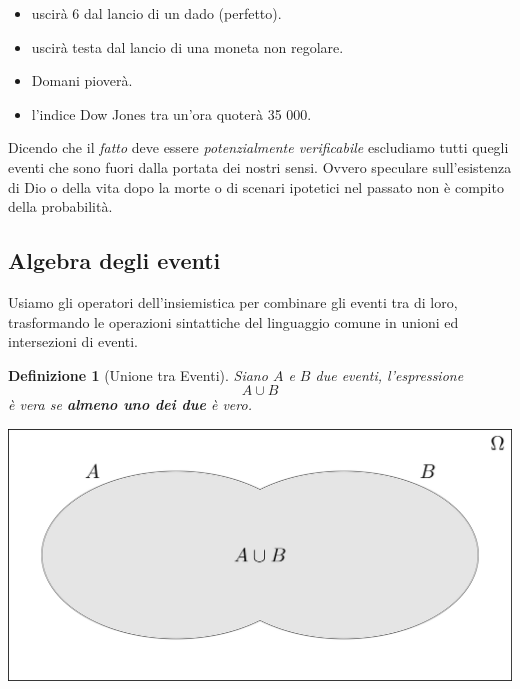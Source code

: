 \documentclass[
  11pt,
]{book}
\providecommand{\tightlist}{%
  \setlength{\itemsep}{0pt}\setlength{\parskip}{0pt}}
\theoremstyle{mytheoremstyle}
\theoremstyle{mydefstyle}
\newtheorem{definition}{Definizione}[section]
\begin{document}
\begin{itemize}
\tightlist
\item
  uscirà 6 dal lancio di un dado (perfetto).
\item
  uscirà testa dal lancio di una moneta non regolare.
\item
  Domani pioverà.
\item
  l'indice Dow Jones tra un'ora quoterà 35 000.
\end{itemize}

Dicendo che il \emph{fatto} deve essere \emph{potenzialmente verificabile}
escludiamo tutti quegli eventi che sono fuori dalla portata dei nostri
sensi. Ovvero speculare sull'esistenza di Dio o della vita dopo la morte
o di scenari ipotetici nel passato non è compito della probabilità.

\subsection{Algebra degli eventi}\label{algebra-degli-eventi}

Usiamo gli operatori dell'insiemistica per combinare gli eventi tra di
loro, trasformando le operazioni sintattiche del linguaggio comune in
unioni ed intersezioni di eventi.

\begin{info}

\begin{definition}[Unione tra Eventi]
Siano \(A\) e \(B\) due eventi, l'espressione \[
A\cup B
\] è vera se \textbf{almeno uno dei due} è vero.
\end{definition}

\end{info}

\begin{center}\includegraphics[width=41.67in,height=0.2\textheight,]{img/unione} \end{center}
\end{document}
